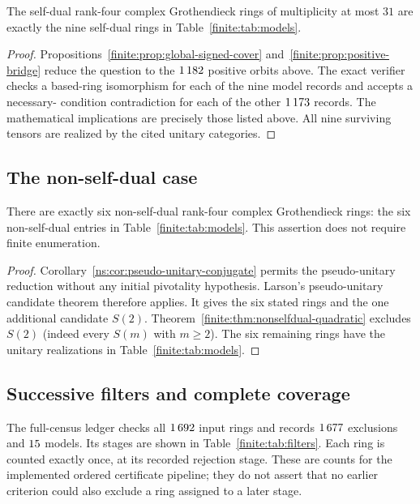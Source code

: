 \begin{theorem}
\label{finite:thm:selfdual-classification}
The self-dual rank-four complex Grothendieck rings of multiplicity at most
$31$ are exactly the nine self-dual rings in Table~\ref{finite:tab:models}.
\end{theorem}
\begin{proof}
Propositions~\ref{finite:prop:global-signed-cover}
and~\ref{finite:prop:positive-bridge} reduce the question to the
$1\,182$ positive orbits above.  The exact verifier checks a based-ring
isomorphism for each of the nine model records and accepts a necessary-
condition contradiction for each of the other $1\,173$ records.
The mathematical implications are precisely those listed above.
All nine surviving tensors are realized by the cited unitary categories.
\end{proof}

\subsection{The non-self-dual case}
\begin{theorem}\label{finite:thm:nonselfdual-classification}
There are exactly six non-self-dual rank-four complex Grothendieck rings:
the six non-self-dual entries in Table~\ref{finite:tab:models}.
This assertion does not require finite enumeration.
\end{theorem}
\begin{proof}
Corollary~\ref{ns:cor:pseudo-unitary-conjugate} permits the
pseudo-unitary reduction without any initial pivotality hypothesis.
Larson's pseudo-unitary candidate theorem \cite[Theorem~1.1]{Larson}
therefore applies.  It gives the six stated rings and the one additional
candidate $S(2)$.  Theorem~\ref{finite:thm:nonselfdual-quadratic} excludes
$S(2)$ (indeed every $S(m)$ with $m\geq2$).  The six remaining rings have
the unitary realizations in Table~\ref{finite:tab:models}.
\end{proof}

\subsection{Successive filters and complete coverage}\label{finite:sec:successive-filters}
The full-census ledger checks all $1\,692$ input rings and records
$1\,677$ exclusions and $15$ models. Its stages are
shown in Table~\ref{finite:tab:filters}. Each ring is counted exactly once,
at its recorded rejection stage. These are counts for the implemented
ordered certificate pipeline; they do not assert that no earlier criterion
could also exclude a ring assigned to a later stage.

